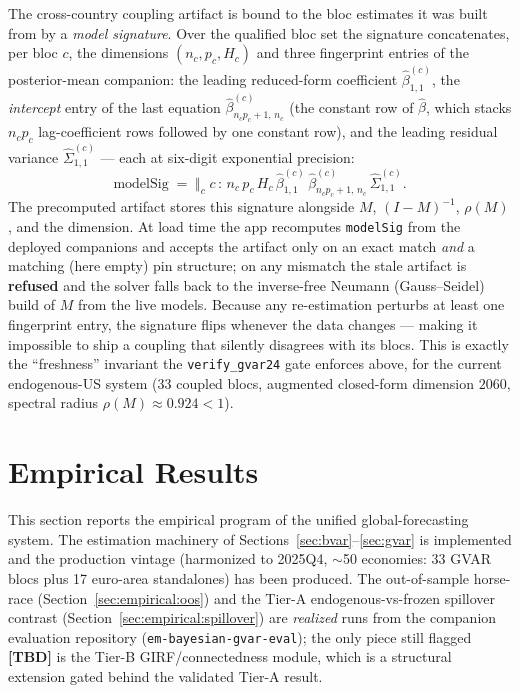 \documentclass[11pt]{article}
\theoremstyle{definition}
\theoremstyle{remark}
\begin{document}
The cross-country coupling artifact is bound to the bloc estimates it was built
from by a \emph{model signature}. Over the qualified bloc set the signature
concatenates, per bloc $c$, the dimensions $(n_c, p_c, H_c)$ and three
fingerprint entries of the posterior-mean companion: the leading reduced-form
coefficient $\hat\beta^{(c)}_{1,1}$, the \emph{intercept} entry of the last
equation $\hat\beta^{(c)}_{n_c p_c + 1,\,n_c}$ (the constant row of
$\hat\beta$, which stacks $n_c p_c$ lag-coefficient rows followed by one
constant row), and the leading residual variance $\hat\Sigma^{(c)}_{1,1}$ ---
each at six-digit exponential precision:
\[
  \mathrm{modelSig} \;=\;
  \big\Vert_{c}\;
  c \,:\, n_c\,p_c\,H_c\,
  \hat\beta^{(c)}_{1,1}\,
  \hat\beta^{(c)}_{n_c p_c + 1,\,n_c}\,
  \hat\Sigma^{(c)}_{1,1}.
\]
The precomputed artifact stores this signature alongside $M$, $(I-M)^{-1}$,
$\rho(M)$, and the dimension. At load time the app recomputes
\texttt{modelSig} from the deployed companions and accepts the artifact only on
an exact match \emph{and} a matching (here empty) pin structure; on any mismatch
the stale artifact is \textbf{refused} and the solver falls back to the
inverse-free Neumann (Gauss--Seidel) build of $M$ from the live models. Because
any re-estimation perturbs at least one fingerprint entry, the signature flips
whenever the data changes --- making it impossible to ship a coupling that
silently disagrees with its blocs. This is exactly the ``freshness'' invariant
the \texttt{verify\_gvar24} gate enforces above, for the current
endogenous-US system (33 coupled blocs, augmented closed-form dimension
$2060$, spectral radius $\rho(M)\approx 0.924<1$).

\section{Empirical Results}\label{sec:empirical}

This section reports the empirical program of the unified global-forecasting system. The estimation machinery of Sections~\ref{sec:bvar}--\ref{sec:gvar} is implemented and the production vintage (harmonized to 2025Q4, $\sim$50 economies: 33 GVAR blocs plus 17 euro-area standalones) has been produced. The out-of-sample horse-race (Section~\ref{sec:empirical:oos}) and the Tier-A endogenous-vs-frozen spillover contrast (Section~\ref{sec:empirical:spillover}) are \emph{realized} runs from the companion evaluation repository (\texttt{em-bayesian-gvar-eval}); the only piece still flagged \textbf{[TBD]} is the Tier-B GIRF/connectedness module, which is a structural extension gated behind the validated Tier-A result.
\end{document}
